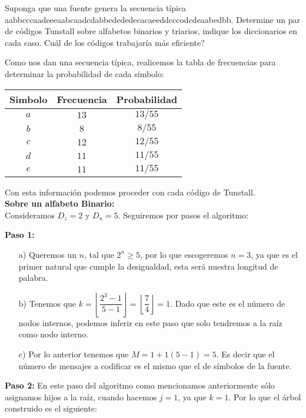 
Suponga que una fuente genera la secuencia típica aabbcccaadeeeaabcaadcdabbedededecacaeeddcccodcdeaabedbb. Determine un par de códigos Tunstall sobre alfabetos binarios y triarios, indique los diccionarios en cada caso. Cuál de los códigos trabajaría más eficiente?
\begin{sols}
 Como nos dan una secuencia típica, realicemos la tabla de frecuencias para determinar la probabilidad de cada símbolo:
 \begin{center}
  \begin{tabular}{|c|c|c|}
  \hline
Simbolo & Frecuencia & Probabilidad \\
\hline
$a$ & $13$ & $13/55$\\
\hline
$b$ & $8$ & $8/55$\\
\hline
$c$ & $12$ & $12/55$\\
\hline
$d$ & $11$ & $11/55$\\
\hline
$e$ & $11$ & $11/55$\\
\hline
 \end{tabular}
 \end{center}
Con esta información podemos proceder con cada código de Tunstall.\\

\textbf{Sobre un alfabeto Binario:}\\

Consideramos $D_z=2$ y $D_u=5.$ Seguiremos por pasos el algoritmo:

\textbf{Paso 1:}
\begin{itemize}
    \item[a)] Queremos un $n$, tal que $2^n\geq 5$, por lo que escogeremos $n=3$, ya que es el primer natural que cumple la desigualdad, esta será nuestra longitud de palabra.
    \item[b)] Tenemos que $k=\left\lfloor\dfrac{2^3-1}{5-1}\right\rfloor=\left\lfloor\dfrac{7}{4}\right\rfloor=1.$ Dado que este es el número de nodos internos, podemos inferir en este paso que solo tendremos a la raíz como nodo interno.
    \item[c)] Por lo anterior tenemos que $M=1+1(5-1)=5.$ Es decir que el número de mensajes a codificar es el mismo que el de símbolos de la fuente.
\end{itemize}
\textbf{Paso 2:}
 En este paso del algoritmo como mencionamos anteriormente sólo asignamos hijos a la raíz, cuando hacemos $j=1$, ya que $k=1.$ Por  lo que el árbol construido es el siguiente:
 \begin{center}
       \begin{tikzpicture}


\end{tikzpicture}
\end{center}
\end{sols}
